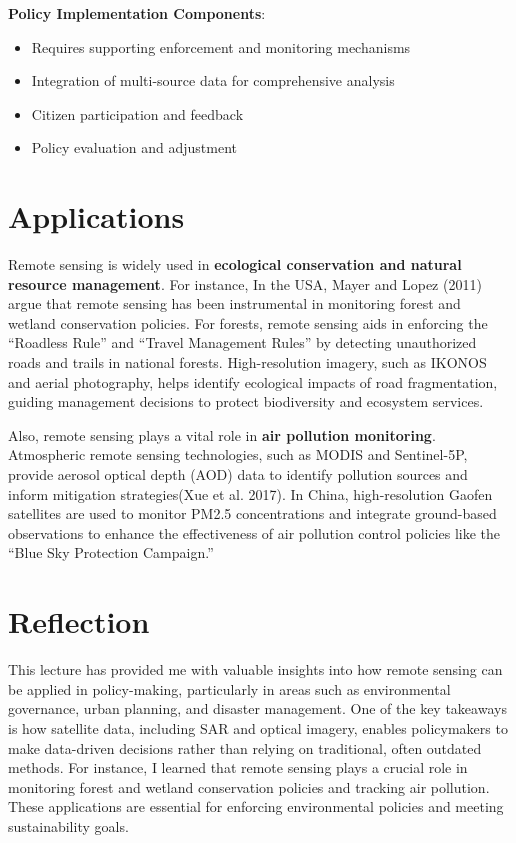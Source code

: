 \documentclass[
  letterpaper,
]{scrbook}
\begin{document}
\textbf{Policy Implementation Components}:

\begin{itemize}
\item
  Requires supporting enforcement and monitoring mechanisms
\item
  Integration of multi-source data for comprehensive analysis
\item
  Citizen participation and feedback
\item
  Policy evaluation and adjustment
\end{itemize}

\section{Applications}\label{applications-2}

Remote sensing is widely used in \textbf{ecological conservation and
natural resource management}. For instance, In the USA, Mayer and Lopez
(2011) argue that remote sensing has been instrumental in monitoring
forest and wetland conservation policies. For forests, remote sensing
aids in enforcing the ``Roadless Rule'' and ``Travel Management Rules''
by detecting unauthorized roads and trails in national forests.
High-resolution imagery, such as IKONOS and aerial photography, helps
identify ecological impacts of road fragmentation, guiding management
decisions to protect biodiversity and ecosystem services.

Also, remote sensing plays a vital role in \textbf{air pollution
monitoring}. Atmospheric remote sensing technologies, such as MODIS and
Sentinel-5P, provide aerosol optical depth (AOD) data to identify
pollution sources and inform mitigation strategies(Xue et al. 2017). In
China, high-resolution Gaofen satellites are used to monitor PM2.5
concentrations and integrate ground-based observations to enhance the
effectiveness of air pollution control policies like the ``Blue Sky
Protection Campaign.''

\section{Reflection}\label{reflection-2}

This lecture has provided me with valuable insights into how remote
sensing can be applied in policy-making, particularly in areas such as
environmental governance, urban planning, and disaster management. One
of the key takeaways is how satellite data, including SAR and optical
imagery, enables policymakers to make data-driven decisions rather than
relying on traditional, often outdated methods. For instance, I learned
that remote sensing plays a crucial role in monitoring forest and
wetland conservation policies and tracking air pollution. These
applications are essential for enforcing environmental policies and
meeting sustainability goals.
\end{document}
